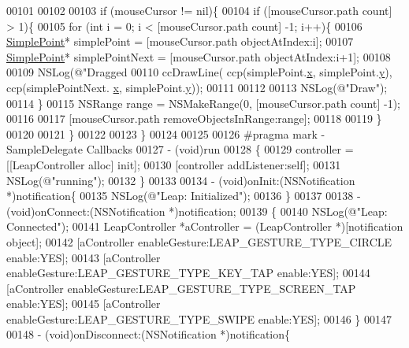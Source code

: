 \begin{DoxyCode}
{00101     
00102     
00103     \textcolor{keywordflow}{if} (mouseCursor != nil)\{
00104         \textcolor{keywordflow}{if} ([mouseCursor.path count] > 1)\{
00105             \textcolor{keywordflow}{for} (\textcolor{keywordtype}{int} i = 0;  i < [mouseCursor.path count] -1; i++)\{
00106                 \hyperlink{interface_simple_point}{SimplePoint}* simplePoint =  [mouseCursor.path objectAtIndex:i];
00107                 \hyperlink{interface_simple_point}{SimplePoint}* simplePointNext = [mouseCursor.path objectAtIndex:i+1];
00108                 
00109                 NSLog(\textcolor{stringliteral}{@"Dragged %
00110                 ccDrawLine( ccp(simplePoint.\hyperlink{interface_simple_point_abb16aaf6215e9e946606b30199b1c3af}{x}, simplePoint.\hyperlink{interface_simple_point_ae10ba2c5156e6061258a0720443cd1c8}{y}), ccp(simplePointNext.
      \hyperlink{interface_simple_point_abb16aaf6215e9e946606b30199b1c3af}{x}, simplePoint.\hyperlink{interface_simple_point_ae10ba2c5156e6061258a0720443cd1c8}{y}));
00111                 
00112                 
00113                 NSLog(\textcolor{stringliteral}{@"Draw"});
00114             \}
00115             NSRange range = NSMakeRange(0, [mouseCursor.path count] -1);
00116             
00117             [mouseCursor.path removeObjectsInRange:range];
00118 
00119         \}
00120 
00121     \}
00122         
00123 \}
00124 
00125 
00126 \textcolor{preprocessor}{#pragma mark - SampleDelegate Callbacks}
00127 \textcolor{preprocessor}{}- (void)run
00128 \{
00129     controller = [[LeapController alloc] init];
00130     [controller addListener:self];
00131     NSLog(\textcolor{stringliteral}{@"running"});
00132 \}
00133 
00134 - (void)onInit:(NSNotification *)notification\{
00135     NSLog(\textcolor{stringliteral}{@"Leap: Initialized"});
00136 \}
00137 
00138 - (void)onConnect:(NSNotification *)notification;
00139 \{
00140     NSLog(\textcolor{stringliteral}{@"Leap: Connected"});
00141     LeapController *aController = (LeapController *)[notification \textcolor{keywordtype}{object}];
00142     [aController enableGesture:LEAP\_GESTURE\_TYPE\_CIRCLE enable:YES];
00143     [aController enableGesture:LEAP\_GESTURE\_TYPE\_KEY\_TAP enable:YES];
00144     [aController enableGesture:LEAP\_GESTURE\_TYPE\_SCREEN\_TAP enable:YES];
00145     [aController enableGesture:LEAP\_GESTURE\_TYPE\_SWIPE enable:YES];
00146 \}
00147 
00148 - (void)onDisconnect:(NSNotification *)notification\{
}}
\end{DoxyCode}
